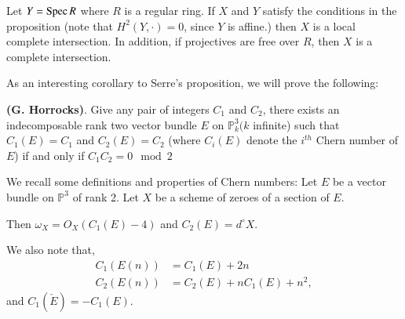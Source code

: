 \begin{Coro*}
Let $Y=\operatorname{Spec} R$ where $R$ is a regular ring. If $X$ and $Y$ satisfy
the conditions in the proposition (note that $H^2(Y,\cdotp)=0$, since
$Y$ is affine.) then $X$ is a local complete intersection. In
addition, if projectives are free over $R$, then $X$ is a complete
intersection. 

As an interesting corollary to Serre's proposition, we will prove the
following: 
\end{Coro*}

\begin{THM*}
{\bf (G. Horrocks)}. Give any pair of integers $C_1$ and $C_2$, there
exists an indecomposable rank two vector bundle $E$ on $\mathbb{P}_k^3
(k$ infinite) such that $C_1(E)=C_1$ and $C_2(E)=C_2$ (where $C_i(E)$
denote the $i^{th}$ Chern number of $E$) if and only if $C_1C_2=0\mod
2$ 

We recall some definitions and properties of Chern numbers: Let $E$ be
a vector bundle on $\mathbb{P}^3$ of rank 2. Let $X$ be a scheme of
zeroes of a section of $E$.

Then $\omega_X=O_X(C_1(E)-4)$ and $C_2(E)=d^\circ X$. 

We also note that,
\begin{align*}
C_1(E(n)) &= C_1(E)+2n\\
C_2(E(n)) &= C_2(E)+n C_1(E)+n^2,
\end{align*}\pageoriginale
and $C_1(\check{E})=-C_1(E)$. 
\end{THM*}

